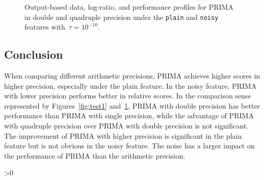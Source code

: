 \documentclass[12pt,a4paper]{article}  %
\newcounter{cite}
\theoremstyle{definition}
\numberwithin{equation}{section}
\begin{document}
\begin{figure}[htbp]
    \caption{Output-based data, log-ratio, and performance profiles for PRIMA in double and quadruple precision under the \texttt{plain} and \texttt{noisy} features with~$\tau = 10^{-10}$.}
    \label{fig:test2}
\end{figure}

\subsection{Conclusion}

When comparing different arithmetic precisions, PRIMA achieves higher scores in higher precision, especially under the plain feature. In the noisy feature, PRIMA with lower precision performs better in relative scores. In the comparison sense represented by Figures~\ref{fig:test1} and~\ref{fig:test2}, PRIMA with double precision has better performance than PRIMA with single precision, while the advantage of PRIMA with quadruple precision over PRIMA with double precision is not significant.
The improvement of PRIMA with higher precision is significant in the plain feature but is not obvious in the noisy feature. The noise has a larger impact on the performance of PRIMA than the arithmetic precision.



\ifnum\value{cite}>0
    \small
    
    
\fi

\end{document}
